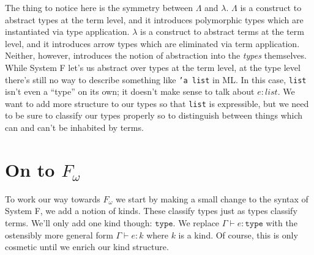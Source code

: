 \documentclass{article}
\newcommand{\type}{\ensuremath{\mathtt{type}}}
\begin{document}

The thing to notice here is the symmetry between $\Lambda$ and $\lambda$.
$\Lambda$ is a construct to abstract types at the term level, and it
introduces polymorphic types which are instantiated via type application.
$\lambda$ is a construct to abstract terms at the term level, and it
introduces arrow types which are eliminated via term application. Neither,
however, introduces the notion of abstraction into the \emph{types}
themselves. While System F let's us abstract over types at the term level, at
the type level there's still no way to describe something like {\tt 'a list}
in ML. In this case, {\tt list} isn't even a ``type'' on its own; it doesn't
make sense to talk about $e : list$. We want to add more structure to our
types so that {\tt list} is expressible, but we need to be sure to classify
our types properly so to distinguish between things which can and can't be
inhabited by terms.

\section{On to $F_\omega$}

To work our way towards $F_\omega$ we start by making a small change
to the syntax of System F, we add a notion of kinds. These classify
types just as types classify terms. We'll only add one kind though:
\type. We replace $\Gamma \vdash e : \type$ with the ostensibly more
general form $\Gamma \vdash e : k$ where $k$ is a kind. Of course,
this is only cosmetic until we enrich our kind structure.
\end{document}

